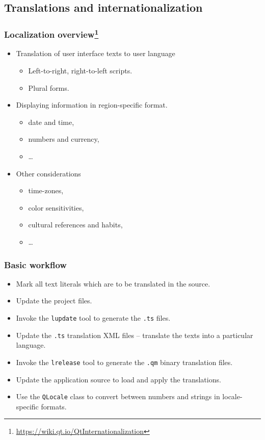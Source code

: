 \subsection{Translations and internationalization}

\begin{frame}
  \frametitle{Localization overview\footnote
    {\url{https://wiki.qt.io/QtInternationalization}}}
  \begin{itemize}
    \item Translation of user interface texts to user language
    \begin{itemize}
      \item Left-to-right, right-to-left scripts.
      \item Plural forms.
    \end{itemize}
    \item Displaying information in region-specific format.
    \begin{itemize}
      \item date and time,
      \item numbers and currency,
      \item \ldots
    \end{itemize}
    \item Other considerations
    \begin{itemize}
      \item time-zones,
      \item color sensitivities,
      \item cultural references and habits,
      \item \ldots
    \end{itemize}
  \end{itemize}
\end{frame}

\begin{frame}
  \frametitle{Basic workflow}
  \small
  \begin{itemize}
    \item Mark all text literals which are to be translated in the source.
    \item Update the project files.
    \item Invoke the \texttt{lupdate} tool to generate the \texttt{.ts} files.
    \item Update the \texttt{.ts} translation XML files -- translate the texts
      into a particular language.
    \item Invoke the \texttt{lrelease} tool to generate the \texttt{.qm} binary
      translation files.
    \item Update the application source to load and apply the translations.
    \item Use the \texttt{QLocale} class to convert between numbers and strings
      in locale-specific formats.
  \end{itemize}
\end{frame}

